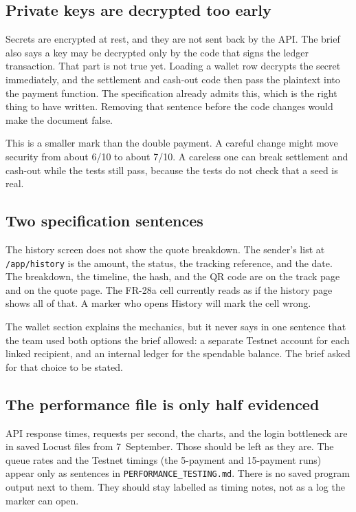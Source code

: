 \documentclass[11pt,a4paper]{article}
\begin{document}
\subsection{Private keys are decrypted too early}

Secrets are encrypted at rest, and they are not sent back by the API. The brief also says a key may be decrypted only by the code that signs the ledger transaction. That part is not true yet. Loading a wallet row decrypts the secret immediately, and the settlement and cash-out code then pass the plaintext into the payment function. The specification already admits this, which is the right thing to have written. Removing that sentence before the code changes would make the document false.

This is a smaller mark than the double payment. A careful change might move security from about 6/10 to about 7/10. A careless one can break settlement and cash-out while the tests still pass, because the tests do not check that a seed is real.

\subsection{Two specification sentences}

The history screen does not show the quote breakdown. The sender's list at \texttt{/app/history} is the amount, the status, the tracking reference, and the date. The breakdown, the timeline, the hash, and the QR code are on the track page and on the quote page. The FR-28a cell currently reads as if the history page shows all of that. A marker who opens History will mark the cell wrong.

The wallet section explains the mechanics, but it never says in one sentence that the team used both options the brief allowed: a separate Testnet account for each linked recipient, and an internal ledger for the spendable balance. The brief asked for that choice to be stated.

\subsection{The performance file is only half evidenced}

API response times, requests per second, the charts, and the login bottleneck are in saved Locust files from 7~September. Those should be left as they are. The queue rates and the Testnet timings (the 5-payment and 15-payment runs) appear only as sentences in \texttt{PERFORMANCE\_TESTING.md}. There is no saved program output next to them. They should stay labelled as timing notes, not as a log the marker can open.
\end{document}
